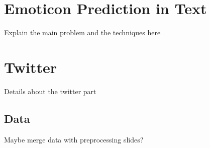 \documentclass[
paper=128mm:96mm, %
fontsize=11pt, %
pagesize, %
parskip=half-, %
]{scrartcl} %
\newcommand*{\mygreen}[1]{\textcolor{mygreen}{#1}}
\newcommand*{\myblue}[1]{\textcolor{myblue}{#1}}
\newcommand*{\mybrown}[1]{\textcolor{mybrown}{#1}}
\newcommand*{\myred}[1]{\textcolor{myred}{#1}}
\theoremstyle{mythmstyle} %
\begin{document}
\section{Emoticon Prediction in Text}


Explain the main problem and the techniques here


\clearpage


\section{Twitter}


Details about the twitter part


\begin{comment}
\textit{Sed iaculis} dapibus gravida. Morbi sed tortor erat, nec interdum arcu. Sed id lorem lectus. Quisque viverra augue id sem ornare non aliquam nibh tristique. Aenean in ligula nisl. Nulla sed tellus ipsum.

\begin{multicols}{2} %
\mygreen{Sed diam enim, sagittis nec} condimentum sit amet, ullamcorper sit amet libero. \mybrown{Aliquam vel dui orci}, a porta odio. \myred{Nullam id suscipit} ipsum. \myblue{Aenean lobortis} commodo sem, ut commodo leo gravida vitae. Pellentesque vehicula ante iaculis arcu pretium rutrum eget sit amet purus. Integer ornare nulla quis neque ultrices lobortis. Vestibulum ultrices tincidunt libero, quis commodo erat ullamcorper id.
\end{multicols}
\end{comment}


\clearpage


\subsection*{Data}


Maybe merge data with preprocessing slides? 


\begin{comment}
\begin{itemize}
\item Lorem ipsum dolor sit amet, consectetur adipiscing elit
\item Aliquam blandit faucibus nisi, sit amet dapibus enim tempus eu
\end{itemize}

\begin{enumerate}
\item Nulla commodo, erat quis gravida posuere, elit lacus lobortis est, quis porttitor odio mauris at libero
\item Nam cursus est eget velit posuere pellentesque
\item Vestibulum faucibus velit a augue condimentum quis convallis nulla gravida
\end{enumerate}
\end{comment}
\end{document}
